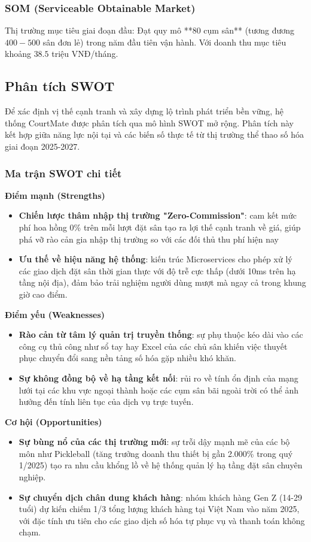\subsubsection{SOM (Serviceable Obtainable Market)}
Thị trường mục tiêu giai đoạn đầu: Đạt quy mô **80 cụm sân** (tương đương $400-500$ sân đơn lẻ) trong năm đầu tiên vận hành. Với doanh thu mục tiêu khoảng $38.5$ triệu VNĐ/tháng.



\subsection{Phân tích SWOT}
Để xác định vị thế cạnh tranh và xây dựng lộ trình phát triển bền vững, hệ thống CourtMate được phân tích qua mô hình SWOT mở rộng. Phân tích này kết hợp giữa năng lực nội tại và các biến số thực tế từ thị trường thể thao số hóa giai đoạn 2025-2027.
\subsubsection{Ma trận SWOT chi tiết}
\noindent \textbf{Điểm mạnh (Strengths)}
\begin{itemize}
    \item \textbf{Chiến lược thâm nhập thị trường "Zero-Commission"}: cam kết mức phí hoa hồng 0\% trên mỗi lượt đặt sân tạo ra lợi thế cạnh tranh về giá, giúp phá vỡ rào cản gia nhập thị trường so với các đối thủ thu phí hiện nay
    \item \textbf{Ưu thế về hiệu năng hệ thống}: kiến trúc Microservices cho phép xử lý các giao dịch đặt sân thời gian thực với độ trễ cực thấp (dưới 10ms trên hạ tầng nội địa), đảm bảo trải nghiệm người dùng mượt mà ngay cả trong khung giờ cao điểm.
\end{itemize}

\noindent \textbf{Điểm yếu (Weaknesses)}
\begin{itemize}
    \item \textbf{Rào cản từ tâm lý quản trị truyền thống}: sự phụ thuộc kéo dài vào các công cụ thủ công như sổ tay hay Excel của các chủ sân khiến việc thuyết phục chuyển đổi sang nền tảng số hóa gặp nhiều khó khăn.
    \item \textbf{Sự không đồng bộ về hạ tầng kết nối}: rủi ro về tính ổn định của mạng lưới tại các khu vực ngoại thành hoặc các cụm sân bãi ngoài trời có thể ảnh hưởng đến tính liên tục của dịch vụ trực tuyến.
\end{itemize}

\noindent \textbf{Cơ hội (Opportunities)}
\begin{itemize}
    \item \textbf{Sự bùng nổ của các thị trường mới}: sự trỗi dậy mạnh mẽ của các bộ môn như Pickleball (tăng trưởng doanh thu thiết bị gần 2.000\% trong quý 1/2025) tạo ra nhu cầu khổng lồ về hệ thống quản lý hạ tầng đặt sân chuyên nghiệp.
    \item \textbf{Sự chuyển dịch chân dung khách hàng}: nhóm khách hàng Gen Z (14-29 tuổi) dự kiến chiếm 1/3 tổng lượng khách hàng tại Việt Nam vào năm 2025, với đặc tính ưu tiên cho các giao dịch số hóa tự phục vụ và thanh toán không chạm.
\end{itemize}

